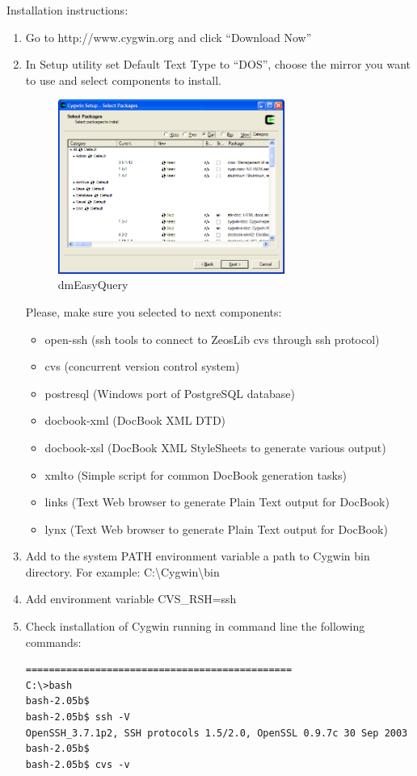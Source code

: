 \documentclass[a4paper,12pt,oneside]{book}
\begin{document}
Installation instructions:
\begin{enumerate}
  \item Go to http://www.cygwin.org and click “Download Now”
	\item In Setup utility set Default Text Type to “DOS”, choose the mirror you want to use and select components to install.
    \begin{figure}[htbp] 
      \centering
      \includegraphics[width=0.7\textwidth]{BTE/CygwinSetup.png}
      \caption{dmEasyQuery}
      \label{fig:CygwinSetup}
    \end{figure}
		Please, make sure you selected to next components:
		\begin{itemize}
		  \item open-ssh (ssh tools to connect to ZeosLib cvs through ssh protocol)
			\item cvs (concurrent version control system)
			\item postresql (Windows port of PostgreSQL database)
			\item docbook-xml (DocBook XML DTD)
			\item docbook-xsl (DocBook XML StyleSheets to generate various output)
			\item xmlto (Simple script for common DocBook generation tasks)
			\item links (Text Web browser to generate Plain Text output for DocBook)
			\item lynx (Text Web browser to generate Plain Text output for DocBook)
		\end{itemize}
	\item 
	  Add to the system PATH environment variable a path to Cygwin bin directory.
		For example: C:\textbackslash Cygwin\textbackslash bin
	\item Add environment variable CVS\_RSH=ssh
	\item Check installation of Cygwin running in command line the following commands:
	  \begin{verbatim}
==============================================
C:\>bash
bash-2.05b$
bash-2.05b$ ssh -V
OpenSSH_3.7.1p2, SSH protocols 1.5/2.0, OpenSSL 0.9.7c 30 Sep 2003
bash-2.05b$
bash-2.05b$ cvs -v


\end{verbatim}
\end{enumerate}
\end{document}
